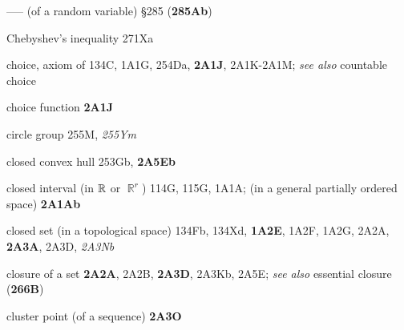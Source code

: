----- (of a random variable) \S285 ({\bf 285Ab})






Chebyshev's inequality 271Xa


choice, axiom of 134C, 1A1G,
  254Da, {\bf 2A1J}, 2A1K-2A1M; 
 {\it see also} countable choice

choice function {\bf 2A1J}















circle group 255M, {\it 255Ym}









closed convex hull 253Gb, {\bf 2A5Eb}




closed interval (in $\Bbb R$ or $\BbbR^r$) 114G, 115G, 1A1A;
  (in a general partially ordered space) {\bf 2A1Ab}
  

closed set (in a topological space) 134Fb, 134Xd, {\bf 1A2E}, 1A2F,
1A2G,
  2A2A, {\bf 2A3A}, 2A3D, {\it 2A3Nb}
  





closure of a set {\bf 2A2A}, 2A2B, {\bf 2A3D}, 2A3Kb, 2A5E; 
{\it see also} essential closure ({\bf 266B})




cluster point
  (of a sequence) {\bf 2A3O}






